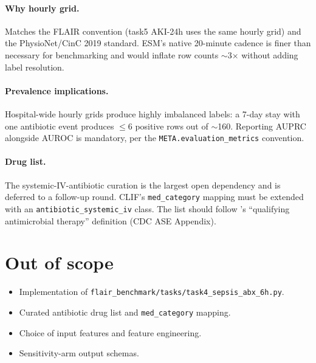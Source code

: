 \documentclass[11pt]{article}
\begin{document}
\paragraph{Why hourly grid.}
Matches the FLAIR convention (task5 AKI-24h uses the same hourly grid) and
the PhysioNet/CinC 2019 standard. ESM's native 20-minute cadence
\citep{wong2021external, kamran2024sepsis} is finer than necessary for
benchmarking and would inflate row counts $\sim$3$\times$ without
adding label resolution.

\paragraph{Prevalence implications.}
Hospital-wide hourly grids produce highly imbalanced labels: a 7-day
stay with one antibiotic event produces $\le 6$ positive rows out of
$\sim$160. Reporting AUPRC alongside AUROC is mandatory, per the
\texttt{META.evaluation\_metrics} convention.

\paragraph{Drug list.}
The systemic-IV-antibiotic curation is the largest open dependency
and is deferred to a follow-up round. CLIF's \texttt{med\_category}
mapping must be extended with an
\texttt{antibiotic\_systemic\_iv} class. The list should follow
\citet{rhee2019sepsis}'s ``qualifying antimicrobial therapy''
definition (CDC ASE Appendix).

\section{Out of scope}

\begin{itemize}[leftmargin=2em]
  \item Implementation of
        \texttt{flair\_benchmark/tasks/task4\_sepsis\_abx\_6h.py}.
  \item Curated antibiotic drug list and \texttt{med\_category}
        mapping.
  \item Choice of input features and feature engineering.
  \item Sensitivity-arm output schemas.
\end{itemize}



\end{document}
